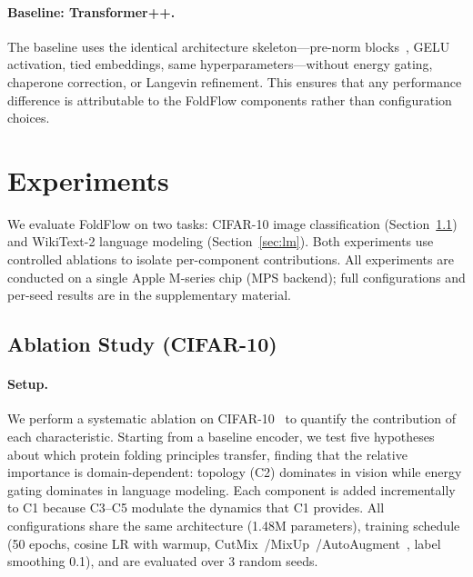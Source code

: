 \documentclass[10pt]{article}
\begin{document}
\paragraph{Baseline: Transformer++.}
The baseline uses the identical architecture skeleton---pre-norm
blocks~\citep{ba2016layer},
GELU activation, tied embeddings, same hyperparameters---without energy
gating, chaperone correction, or Langevin refinement.  This ensures that
any performance difference is attributable to the FoldFlow components
rather than configuration choices.

\section{Experiments}
\label{sec:experiments}

We evaluate FoldFlow on two tasks: CIFAR-10 image classification
(Section~\ref{sec:ablation}) and WikiText-2 language modeling
(Section~\ref{sec:lm}).  Both experiments use controlled ablations to
isolate per-component contributions.  All experiments are conducted on a
single Apple M-series chip (MPS backend); full configurations and per-seed results are
in the supplementary material.

\subsection{Ablation Study (CIFAR-10)}
\label{sec:ablation}

\paragraph{Setup.}
We perform a systematic ablation on CIFAR-10~\citep{krizhevsky2009cifar}
to quantify the contribution of each characteristic.  Starting from a
baseline encoder, we test five hypotheses about which protein folding principles transfer, finding that the relative importance is domain-dependent: topology (C2) dominates in vision while energy gating dominates in language modeling. Each component is added incrementally to C1 because C3--C5 modulate the dynamics that C1 provides.  All configurations share the same architecture
(1.48M parameters), training schedule (50 epochs, cosine LR with warmup,
CutMix~\citep{yun2019cutmix}/MixUp~\citep{zhang2018mixup}/AutoAugment~\citep{cubuk2020randaugment},
label smoothing 0.1), and are evaluated over 3 random seeds.
\end{document}
